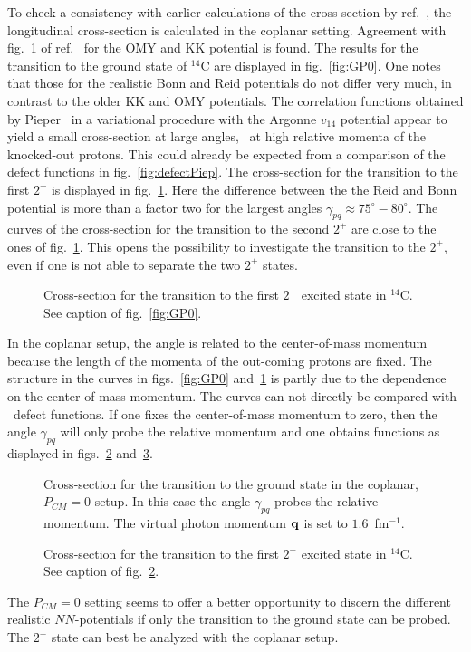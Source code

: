 To check a consistency with earlier calculations of the cross-section by
ref.~\cite{GP92}, the longitudinal cross-section is calculated in the 
coplanar setting.
Agreement with fig.~1 of ref.~\cite{GP92} for the OMY and KK potential is found.
The results for the transition to the ground state of $^{14}$C are displayed in
fig.~\ref{fig:GP0}. One notes that those for the realistic Bonn and Reid 
potentials do not differ very much, in contrast to the older KK and OMY 
potentials. The correlation functions obtained by Pieper \etal\ in a 
variational procedure with the Argonne $v_{14}$ potential\cite{PWP92} appear 
to yield a small cross-section at large angles, \ie\ at high relative momenta 
of the knocked-out protons. This could already be expected from a comparison of 
the defect functions in fig.~\ref{fig:defectPiep}.
%
The cross-section for the transition to the first $2^+$ is displayed in 
fig.~\ref{fig:GP2}. Here the difference between the the Reid and Bonn 
potential is more than a factor two for the largest angles
$\gamma_{pq} \approx 75^\circ - 80^\circ$. The curves of the cross-section
for the transition to the second $2^+$ are close to the ones of 
fig.~\ref{fig:GP2}. This opens the possibility to investigate the transition 
to the $2^+$, even if one is not able to separate the two $2^+$ states.
\begin{figure}
\centerline{}
\caption[]{
Cross-section for the transition to the first $2^+$ excited state in $^{14}$C.
See caption of fig.~\ref{fig:GP0}.
\label{fig:GP2}
}
\end{figure}
In 
the coplanar setup, the angle is related to the center-of-mass momentum because
the length of the momenta of the out-coming protons are fixed. 
The structure in the curves in figs.~\ref{fig:GP0} and~\ref{fig:GP2} is 
partly due to the dependence on the center-of-mass momentum. The curves can not
directly be compared with \eg\ defect functions.
If one fixes the center-of-mass
momentum to zero, then the angle $\gamma_{pq}$ will only probe the relative
momentum and one obtains functions as displayed in figs.~\ref{fig:cmvar0} 
and~\ref{fig:cmvar2}. 
\begin{figure}
\centerline{}
\caption[]{
\label{fig:cmvar0}
Cross-section for the transition to the ground state in the coplanar, 
$P_{CM}=0$ setup. In this case the angle $\gamma_{pq}$ probes the relative 
momentum. The virtual photon momentum ${\bf q}$ is set to $1.6$~fm$^{-1}$. 
}
\end{figure}
\begin{figure}
\centerline{}
\caption[]{
Cross-section for the transition to the first $2^+$ excited state in $^{14}$C.
See caption of fig.~\ref{fig:cmvar0}.
\label{fig:cmvar2}
}
\end{figure}
The $P_{CM}=0$ setting seems to offer a better opportunity to discern the 
different realistic $NN$-potentials if only the transition to the ground state
can be probed. The $2^+$ state can best be analyzed with the coplanar setup.
